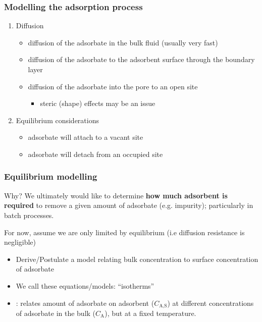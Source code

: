 \begin{frame}\frametitle{Modelling the adsorption process}
	\begin{enumerate}
		\item	Diffusion
			\begin{itemize}
				\item	diffusion of the adsorbate in the bulk fluid (usually very fast)
				\item	diffusion of the adsorbate to the adsorbent surface through the boundary layer
				\item	diffusion of the adsorbate into the pore to an open site
				\begin{itemize}
					\item	steric (shape) effects may be an issue
				\end{itemize}
			\end{itemize}
		\item	Equilibrium considerations
			\begin{itemize}
				\item	adsorbate will attach to a vacant site
				\item	adsorbate will detach from an occupied site
			\end{itemize}
	\end{enumerate}
\end{frame}

\begin{frame}\frametitle{Equilibrium modelling}
	\begin{exampleblock}{Why?}
		We ultimately would like to determine \textbf{how much adsorbent is required} to remove a given amount of adsorbate (e.g. impurity); particularly in batch processes.
	\end{exampleblock}

	\vspace{12pt}
	For now, assume we are only limited by equilibrium (i.e diffusion resistance is negligible)	
	\begin{itemize}
		\item	Derive/Postulate a model relating bulk concentration to surface concentration of adsorbate
		\item	We call these equations/models: ``isotherms''
		\item	{\color{purple}{Isotherm}}: relates amount of adsorbate on adsorbent ($C_\text{A,S}$) at different concentrations of adsorbate in the bulk ($C_\text{A}$), but at a fixed temperature.
	\end{itemize}
\end{frame}


